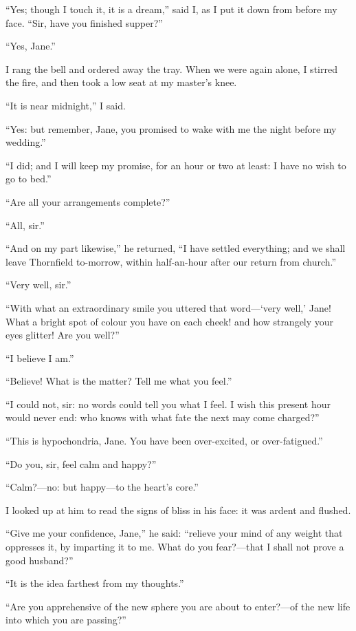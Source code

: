 \enquote{Yes; though I touch it, it is a dream,} said I, as I put it
down from before my face.  \enquote{Sir, have you finished supper?}

\enquote{Yes, Jane.}

I rang the bell and ordered away the tray.  When we were again alone, I
stirred the fire, and then took a low seat at my master's knee.

\enquote{It is near midnight,} I said.

\enquote{Yes: but remember, Jane, you promised to wake with me the night
before my wedding.}

\enquote{I did; and I will keep my promise, for an hour or two at least:
I have no wish to go to bed.}

\enquote{Are all your arrangements complete?}

\enquote{All, sir.}

\enquote{And on my part likewise,} he returned, \enquote{I have settled
everything; and we shall leave Thornfield to-morrow, within half-an-hour
after our return from church.}

\enquote{Very well, sir.}

\enquote{With what an extraordinary smile you uttered that word---\enquote{very
well,} Jane!  What a bright spot of colour you have on each cheek! and
how strangely your eyes glitter!  Are you well?}

\enquote{I believe I am.}

\enquote{Believe!  What is the matter?  Tell me what you feel.}

\enquote{I could not, sir: no words could tell you what I feel.  I wish
this present hour would never end: who knows with what fate the next may
come charged?}

\enquote{This is hypochondria, Jane.  You have been over-excited, or
over-fatigued.}

\enquote{Do you, sir, feel calm and happy?}

\enquote{Calm?---no: but happy---to the heart's core.}

I looked up at him to read the signs of bliss in his face: it was ardent
and flushed.

\enquote{Give me your confidence, Jane,} he said: \enquote{relieve your
mind of any weight that oppresses it, by imparting it to me.  What do
you fear?---that I shall not prove a good husband?}

\enquote{It is the idea farthest from my thoughts.}

\enquote{Are you apprehensive of the new sphere you are about to
enter?---of the new life into which you are passing?}

